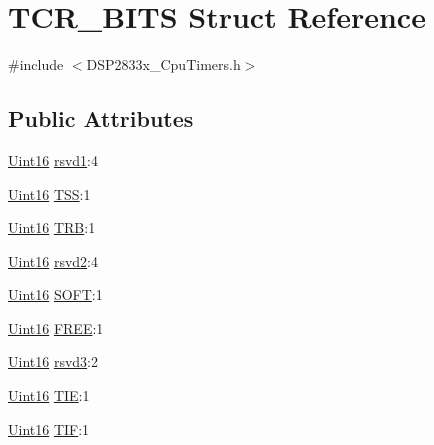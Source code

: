 \hypertarget{struct_t_c_r___b_i_t_s}{}\section{T\+C\+R\+\_\+\+B\+I\+T\+S Struct Reference}
\label{struct_t_c_r___b_i_t_s}


{\ttfamily \#include $<$D\+S\+P2833x\+\_\+\+Cpu\+Timers.\+h$>$}

\subsection*{Public Attributes}
\begin{DoxyCompactItemize}
\item 
\hyperlink{_d_s_p2833x___device_8h_a59a9f6be4562c327cbfb4f7e8e18f08b}{Uint16} \hyperlink{struct_t_c_r___b_i_t_s_a687d53ac0f805a89a4acc8b8d32cf73e}{rsvd1}\+:4
\item 
\hyperlink{_d_s_p2833x___device_8h_a59a9f6be4562c327cbfb4f7e8e18f08b}{Uint16} \hyperlink{struct_t_c_r___b_i_t_s_a6308ea6a3826961b6de099d2cc6c2663}{T\+S\+S}\+:1
\item 
\hyperlink{_d_s_p2833x___device_8h_a59a9f6be4562c327cbfb4f7e8e18f08b}{Uint16} \hyperlink{struct_t_c_r___b_i_t_s_a81c378efa63bd5878e67d9a4ec14d5a9}{T\+R\+B}\+:1
\item 
\hyperlink{_d_s_p2833x___device_8h_a59a9f6be4562c327cbfb4f7e8e18f08b}{Uint16} \hyperlink{struct_t_c_r___b_i_t_s_a166d1c2962847b7cce6be5cfb856fbb1}{rsvd2}\+:4
\item 
\hyperlink{_d_s_p2833x___device_8h_a59a9f6be4562c327cbfb4f7e8e18f08b}{Uint16} \hyperlink{struct_t_c_r___b_i_t_s_a7ac3fec3d9828d2cee647423f050a9d9}{S\+O\+F\+T}\+:1
\item 
\hyperlink{_d_s_p2833x___device_8h_a59a9f6be4562c327cbfb4f7e8e18f08b}{Uint16} \hyperlink{struct_t_c_r___b_i_t_s_a7c0f40fe0a0b01676e1cd004cc4ea10d}{F\+R\+E\+E}\+:1
\item 
\hyperlink{_d_s_p2833x___device_8h_a59a9f6be4562c327cbfb4f7e8e18f08b}{Uint16} \hyperlink{struct_t_c_r___b_i_t_s_a52b3caeb2c31b3ae50d40eb623386920}{rsvd3}\+:2
\item 
\hyperlink{_d_s_p2833x___device_8h_a59a9f6be4562c327cbfb4f7e8e18f08b}{Uint16} \hyperlink{struct_t_c_r___b_i_t_s_a55234d492e5b9cbe53b06190f73bef03}{T\+I\+E}\+:1
\item 
\hyperlink{_d_s_p2833x___device_8h_a59a9f6be4562c327cbfb4f7e8e18f08b}{Uint16} \hyperlink{struct_t_c_r___b_i_t_s_a6a08bcf84c05eb8ee568bfb745cc38c9}{T\+I\+F}\+:1
\end{DoxyCompactItemize}



